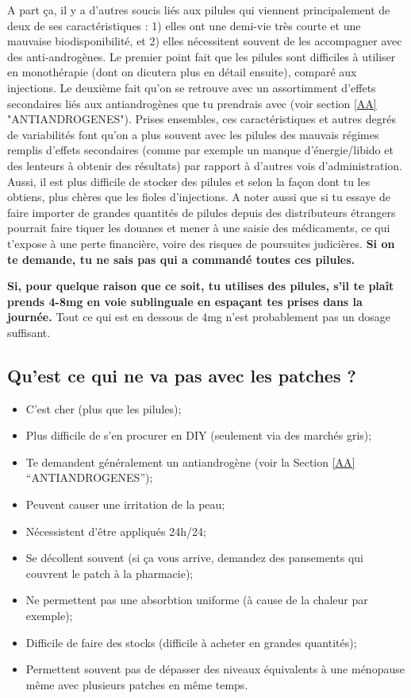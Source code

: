 \documentclass{article}
\begin{document}
A part ça, il y a d'autres soucis liés aux pilules qui viennent principalement de deux de ses caractéristiques : 1) elles ont une demi-vie très courte et une mauvaise biodisponibilité, et 2) elles nécessitent souvent de les accompagner avec des anti-androgènes. Le premier point fait que les pilules sont difficiles à utiliser en monothérapie (dont on dicutera plus en détail ensuite), comparé aux injections. Le deuxième fait qu'on se retrouve avec un assortimment d'effets secondaires liés aux antiandrogènes que tu prendrais avec (voir section \ref{AA} "ANTIANDROGENES"). Prises ensembles, ces caractéristiques et autres degrés de variabilités font qu'on a plus souvent avec les pilules des mauvais régimes remplis d'effets secondaires (comme par exemple un manque d'énergie/libido et des lenteurs à obtenir des résultats) par rapport à d'autres vois d'administration. Aussi, il est plus difficile de stocker des pilules et selon la façon dont tu les obtiens, plus chères que les fioles d'injections. A noter aussi que si tu essaye de faire importer de grandes quantités de pilules depuis des distributeurs étrangers pourrait faire tiquer les douanes et mener à une saisie des médicaments, ce qui t'expose à une perte financière, voire des risques de poursuites judicières. \textbf{Si on te demande, tu ne sais pas qui a commandé toutes ces pilules.}

\textbf{Si, pour quelque raison que ce soit, tu utilises des pilules, s'il te plaît prends 4-8mg en voie sublinguale en espaçant tes prises dans la journée.} Tout ce qui est en dessous de 4mg n'est probablement pas un dosage suffisant.

\subsection{Qu'est ce qui ne va pas avec les patches ?}

\begin{itemize}
  \item C'est cher (plus que les pilules);
  \item Plus difficile de s'en procurer en DIY (seulement via des marchés gris);
  \item Te demandent généralement un antiandrogène (voir la  Section \ref{AA} “ANTIANDROGENES”);
  \item Peuvent causer une irritation de la peau;
  \item Nécessistent d'être appliqués 24h/24;
  \item Se décollent souvent (si ça vous arrive, demandez des pansements qui couvrent le patch à la pharmacie);
  \item Ne permettent pas une absorbtion uniforme (à cause de la chaleur par exemple);
  \item Difficile de faire des stocks (difficile à acheter en grandes quantités);
  \item Permettent souvent pas de dépasser des niveaux équivalents à une ménopause même avec plusieurs patches en même temps.
\end{itemize}
\end{document}
